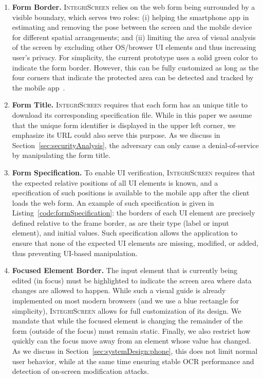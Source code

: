 \documentclass[sigconf, anonymous, balance=false]{acmart}
\let\oldding\ding%
\renewcommand{\ding}[2][1]{\scalebox{#1}{\oldding{#2}}}%
\newcommand{\one}{\ding[1.2]{172}\xspace}
\newcommand{\two}{\ding[1.2]{173}\xspace}
\newcommand{\three}{\ding[1.2]{174}\xspace}
\newcommand{\four}{\ding[1.2]{175}\xspace}
\newcommand{\app}{smartphone app\xspace}
\newcommand{\sysname}{\textsc{IntegriScreen}\xspace}
\begin{document}
\begin{enumerate}
	\item[\one] \textbf{Form Border.}
	\sysname relies on the web form being surrounded by a visible boundary, which serves two roles:
	(i) helping the \app in estimating and removing the pose between the screen and the mobile device for different spatial arrangements; and
	(ii) limiting the area of visual analysis of the screen by excluding other OS/browser UI elements and thus increasing user's privacy.
	For simplicity, the current prototype uses a solid green color to indicate the form border.
	However, this can be fully customized as long as the four corners that indicate the protected area can be detected and tracked by the mobile app~\cite{zhang2002visual}.


	\item[\two] \textbf{Form Title.} \sysname requires that each form has an unique title to download its corresponding specification file.
	While in this paper we assume that the unique form identifier is displayed in the upper left corner, we emphasize its URL could also serve this purpose.
	As we discuss in Section~\ref{sec:securityAnalysis}, the adversary can only cause a denial-of-service by manipulating the form title.

	\item[\three] \textbf{Form Specification.}
	To enable UI verification, \sysname requires that the expected relative positions of all UI elements is known, and a specification of such positions is available to the mobile app after the client loads the web form.
	An example of such specification is given in Listing~\ref{code:formSpecification}: the borders of each UI element are precisely defined relative to the frame border, as are their type (label or input element), and initial values.
	Such specification allows the application to ensure that none of the expected UI elements are missing, modified, or added, thus preventing UI-based manipulation.

	\item[\four] \textbf{Focused Element Border.}
	The input element that is currently being edited (in focus) must be highlighted to indicate the screen area where data changes are allowed to happen.
	While such a visual guide is already implemented on most modern browsers (and we use a blue rectangle for simplicity), \sysname allows for full customization of its design.
	We mandate that while the focused element is changing the remainder of the form (outside of the focus) must remain static.
	Finally, we also restrict how quickly can the focus move away from an element whose value has changed.
	As we discuss in Section~\ref{sec:systemDesign:phone}, this does not limit normal user behavior, while at the same time ensuring stable OCR performance and detection of on-screen modification attacks.


\end{enumerate}
\end{document}
